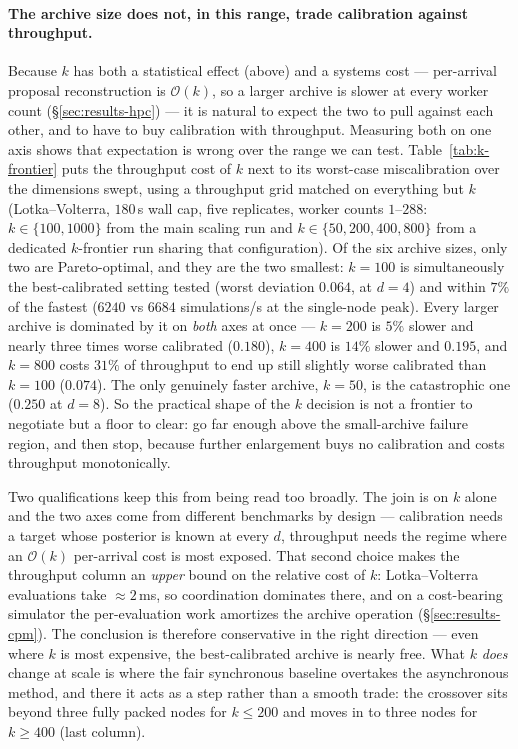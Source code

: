 \paragraph{The archive size does not, in this range, trade calibration against throughput.} Because $k$ has both a statistical effect (above) and a systems cost --- per-arrival proposal reconstruction is $\mathcal{O}(k)$, so a larger archive is slower at every worker count (\S\ref{sec:results-hpc}) --- it is natural to expect the two to pull against each other, and to have to buy calibration with throughput. Measuring both on one axis shows that expectation is wrong over the range we can test. Table~\ref{tab:k-frontier} puts the throughput cost of $k$ next to its worst-case miscalibration over the dimensions swept, using a throughput grid matched on everything but $k$ (Lotka--Volterra, $180$\,s wall cap, five replicates, worker counts $1$--$288$: $k\in\{100,1000\}$ from the main scaling run and $k\in\{50,200,400,800\}$ from a dedicated $k$-frontier run sharing that configuration). Of the six archive sizes, only two are Pareto-optimal, and they are the two smallest: $k=100$ is simultaneously the best-calibrated setting tested (worst deviation $0.064$, at $d=4$) and within $7\%$ of the fastest ($6240$ vs $6684$ simulations/s at the single-node peak). Every larger archive is dominated by it on \emph{both} axes at once --- $k=200$ is $5\%$ slower and nearly three times worse calibrated ($0.180$), $k=400$ is $14\%$ slower and $0.195$, and $k=800$ costs $31\%$ of throughput to end up still slightly worse calibrated than $k=100$ ($0.074$). The only genuinely faster archive, $k=50$, is the catastrophic one ($0.250$ at $d=8$). So the practical shape of the $k$ decision is not a frontier to negotiate but a floor to clear: go far enough above the small-archive failure region, and then stop, because further enlargement buys no calibration and costs throughput monotonically.

Two qualifications keep this from being read too broadly. The join is on $k$ alone and the two axes come from different benchmarks by design --- calibration needs a target whose posterior is known at every $d$, throughput needs the regime where an $\mathcal{O}(k)$ per-arrival cost is most exposed. That second choice makes the throughput column an \emph{upper} bound on the relative cost of $k$: Lotka--Volterra evaluations take ${\approx}2$\,ms, so coordination dominates there, and on a cost-bearing simulator the per-evaluation work amortizes the archive operation (\S\ref{sec:results-cpm}). The conclusion is therefore conservative in the right direction --- even where $k$ is most expensive, the best-calibrated archive is nearly free. What $k$ \emph{does} change at scale is where the fair synchronous baseline overtakes the asynchronous method, and there it acts as a step rather than a smooth trade: the crossover sits beyond three fully packed nodes for $k\le200$ and moves in to three nodes for $k\ge400$ (last column).

